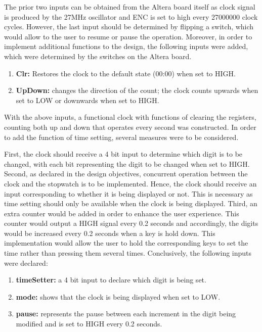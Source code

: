 \documentclass[12pt,a4paper]{article}
\begin{document}
\vspace{-0.2cm}
	\noindent The prior two inputs can be obtained from the Altera board itself as clock signal is produced by the 27MHz oscillator and ENC is set to high every 27000000 clock cycles. However, the last input should be determined by flipping a switch, which would allow to the user to resume or pause the operation. Moreover, in order to implement additional functions to the design, the following inputs were added, which were determined by the switches on the Altera board.
	
	\begin{enumerate}
		\item \textbf{Clr:} Restores the clock to the default state (00:00) when set to HIGH.
		\item \textbf{UpDown:} changes the direction of the count; the clock counts upwards when set to LOW or downwards when set to HIGH.
	\end{enumerate}
	
	\noindent With the above inputs, a functional clock with functions of clearing the registers, counting both up and down that operates every second was constructed. In order to add the function of time setting, several measures were to be considered. 
	
	\noindent First, the clock should receive a 4 bit input to determine which digit is to be changed, with each bit representing the digit to be changed when set to HIGH. Second, as declared in the design objectives, concurrent operation between the clock and the stopwatch is to be implemented. Hence, the clock should receive an input corresponding to whether it is being displayed or not. This is necessary as time setting should only be available when the clock is being displayed. Third, an extra counter would be added in order to enhance the user experience. This counter would output a HIGH signal every 0.2 seconds and accordingly, the digits would be increased every 0.2 seconds when a key is hold down. This implementation would allow the user to hold the corresponding keys to set the time rather than pressing them several times. Conclusively, the following inputs were declared:
	\begin{enumerate}
		\item \textbf{timeSetter:} a 4 bit input to declare which digit is being set.
		\item \textbf{mode:} shows that the clock is being displayed when set to LOW.
		\item \textbf{pause:} represents the pause between each increment in the digit being modified and is set to HIGH every 0.2 seconds.
	\end{enumerate}
\end{document}
